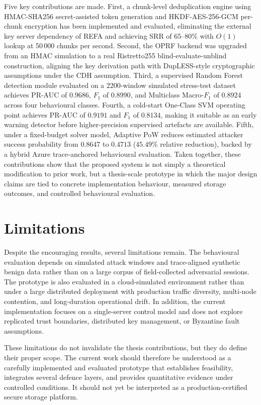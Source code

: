 \documentclass[12pt,a4paper,oneside]{report}
\begin{document}
Five key contributions are made.
First, a chunk-level deduplication engine using HMAC-SHA256 secret-assisted token generation and HKDF-AES-256-GCM per-chunk encryption has been implemented and evaluated, eliminating the external key server dependency of REFA and achieving SRR of $65$--$80\%$ with $O(1)$ lookup at 50\,000 chunks per second.
Second, the OPRF backend was upgraded from an HMAC simulation to a real Ristretto255 blind-evaluate-unblind construction, aligning the key derivation path with DupLESS-style cryptographic assumptions under the CDH assumption.
Third, a supervised Random Forest detection module evaluated on a 2200-window simulated stress-test dataset achieves PR-AUC of $0.9686$, $F_1$ of $0.8990$, and Multiclass Macro-$F_1$ of $0.8924$ across four behavioural classes.
Fourth, a cold-start One-Class SVM operating point achieves PR-AUC of $0.9191$ and $F_1$ of $0.8134$, making it suitable as an early warning detector before higher-precision supervised artefacts are available.
Fifth, under a fixed-budget solver model, Adaptive PoW reduces estimated attacker success probability from $0.8647$ to $0.4713$ ($45.49\%$ relative reduction), backed by a hybrid Azure trace-anchored behavioural evaluation.
Taken together, these contributions show that the proposed system is not simply a theoretical modification to prior work, but a thesis-scale prototype in which the major design claims are tied to concrete implementation behaviour, measured storage outcomes, and controlled behavioural evaluation.

\section{Limitations}

Despite the encouraging results, several limitations remain.
The behavioural evaluation depends on simulated attack windows and trace-aligned synthetic benign data rather than on a large corpus of field-collected adversarial sessions.
The prototype is also evaluated in a cloud-simulated environment rather than under a large distributed deployment with production traffic diversity, multi-node contention, and long-duration operational drift.
In addition, the current implementation focuses on a single-server control model and does not explore replicated trust boundaries, distributed key management, or Byzantine fault assumptions.

These limitations do not invalidate the thesis contributions, but they do define their proper scope.
The current work should therefore be understood as a carefully implemented and evaluated prototype that establishes feasibility, integrates several defence layers, and provides quantitative evidence under controlled conditions.
It should not yet be interpreted as a production-certified secure storage platform.
\end{document}

